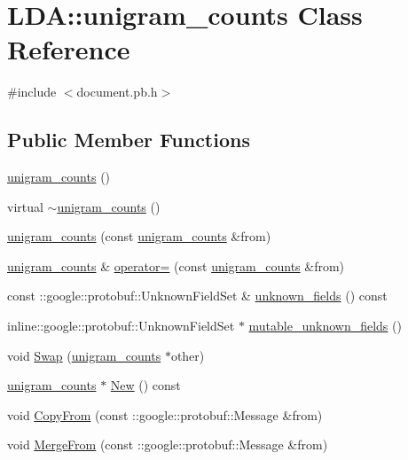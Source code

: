 \hypertarget{class_l_d_a_1_1unigram__counts}{
\section{LDA::unigram\_\-counts Class Reference}
\label{class_l_d_a_1_1unigram__counts}
}


{\ttfamily \#include $<$document.pb.h$>$}

\subsection*{Public Member Functions}
\begin{DoxyCompactItemize}
\item 
\hyperlink{class_l_d_a_1_1unigram__counts_a9968a54fca05e2d01f60d8abf41aad75}{unigram\_\-counts} ()
\item 
virtual \hyperlink{class_l_d_a_1_1unigram__counts_a9121992c8cbfc0ef523ff5eee79f21cd}{$\sim$unigram\_\-counts} ()
\item 
\hyperlink{class_l_d_a_1_1unigram__counts_aa712b911cd9318281022415970e5cc95}{unigram\_\-counts} (const \hyperlink{class_l_d_a_1_1unigram__counts}{unigram\_\-counts} \&from)
\item 
\hyperlink{class_l_d_a_1_1unigram__counts}{unigram\_\-counts} \& \hyperlink{class_l_d_a_1_1unigram__counts_a977a022d9df1590f2be62efce720596b}{operator=} (const \hyperlink{class_l_d_a_1_1unigram__counts}{unigram\_\-counts} \&from)
\item 
const ::google::protobuf::UnknownFieldSet \& \hyperlink{class_l_d_a_1_1unigram__counts_aea286b23f4bab63417ca448f671b236b}{unknown\_\-fields} () const 
\item 
inline::google::protobuf::UnknownFieldSet $\ast$ \hyperlink{class_l_d_a_1_1unigram__counts_a142f99b577a7f5ebf3edd3051176a923}{mutable\_\-unknown\_\-fields} ()
\item 
void \hyperlink{class_l_d_a_1_1unigram__counts_a0d74c455130e7e494773d4767ef86886}{Swap} (\hyperlink{class_l_d_a_1_1unigram__counts}{unigram\_\-counts} $\ast$other)
\item 
\hyperlink{class_l_d_a_1_1unigram__counts}{unigram\_\-counts} $\ast$ \hyperlink{class_l_d_a_1_1unigram__counts_a058037380393e3158c703241ee45bd2e}{New} () const 
\item 
void \hyperlink{class_l_d_a_1_1unigram__counts_ad4dc1f88526f6873ebc0ba70d2a2c347}{CopyFrom} (const ::google::protobuf::Message \&from)
\item 
void \hyperlink{class_l_d_a_1_1unigram__counts_a22b8f2a7a881a008c9af79b3c0f0a8aa}{MergeFrom} (const ::google::protobuf::Message \&from)

\end{DoxyCompactItemize}
